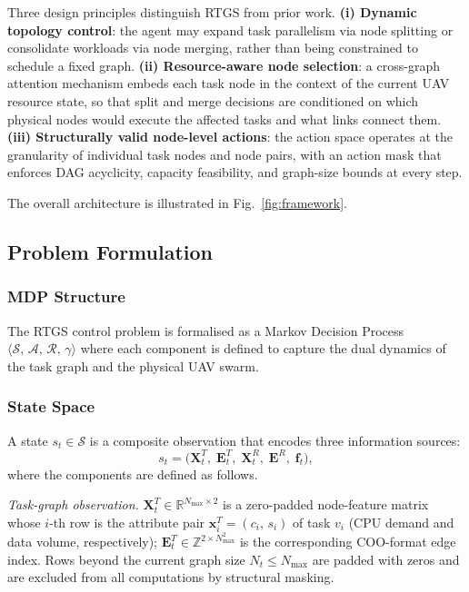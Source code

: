 Three design principles distinguish RTGS from prior work.
\textbf{(i) Dynamic topology control}: the agent may expand
task parallelism via node splitting or consolidate workloads via node
merging, rather than being constrained to schedule a fixed graph.
\textbf{(ii) Resource-aware node selection}: a cross-graph attention
mechanism embeds each task node in the context of the current UAV
resource state, so that split and merge decisions are conditioned on
which physical nodes would execute the affected tasks and what links
connect them.
\textbf{(iii) Structurally valid node-level actions}: the action
space operates at the granularity of individual task nodes and
node pairs, with an action mask that enforces DAG acyclicity,
capacity feasibility, and graph-size bounds at every step.

The overall architecture is illustrated in Fig.~\ref{fig:framework}.

\subsection{Problem Formulation}
\label{subsec:mdp}

\subsubsection*{MDP Structure}

The RTGS control problem is formalised as a Markov Decision Process
$\langle \mathcal{S},\, \mathcal{A},\, \mathcal{R},\, \gamma \rangle$
where each component is defined to capture the dual dynamics of the
task graph and the physical UAV swarm.

\subsubsection*{State Space}

A state $s_t \in \mathcal{S}$ is a composite observation that encodes
three information sources:
\begin{equation}
  s_t = \bigl(
    \mathbf{X}^T_t,\; \mathbf{E}^T_t,\;
    \mathbf{X}^R_t,\; \mathbf{E}^R,\;
    \mathbf{f}_t
  \bigr),
  \label{eq:state}
\end{equation}
where the components are defined as follows.

\textit{Task-graph observation.}
$\mathbf{X}^T_t \in \mathbb{R}^{N_{\max} \times 2}$ is a
zero-padded node-feature matrix whose $i$-th row is the attribute
pair $\mathbf{x}_i^T = (c_i,\, s_i)$ of task $v_i$ (CPU demand and
data volume, respectively); $\mathbf{E}^T_t \in
\mathbb{Z}^{2 \times N_{\max}^2}$ is the corresponding COO-format
edge index.
Rows beyond the current graph size $N_t \leq N_{\max}$ are padded
with zeros and are excluded from all computations by structural
masking.

